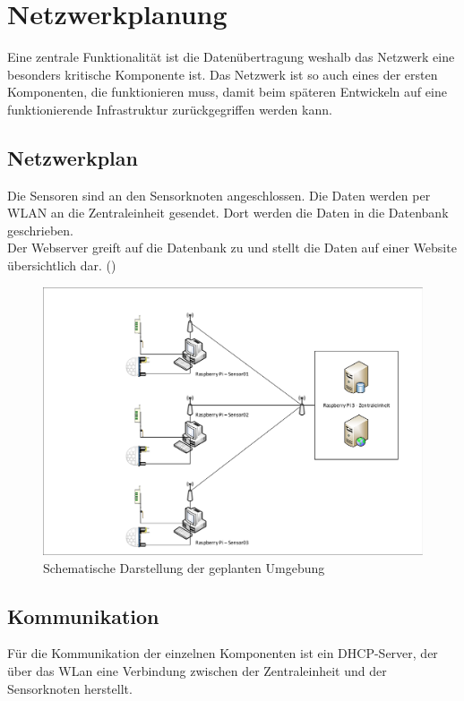 \section{Netzwerkplanung}
Eine zentrale Funktionalität ist die Datenübertragung weshalb das Netzwerk eine besonders kritische Komponente ist. Das Netzwerk ist so auch eines der ersten Komponenten, die funktionieren muss, damit beim späteren Entwickeln auf eine funktionierende Infrastruktur zurückgegriffen werden kann.
\subsection{Netzwerkplan}
Die Sensoren sind an den Sensorknoten angeschlossen. Die Daten werden per WLAN
an die Zentraleinheit gesendet. Dort werden die Daten in die Datenbank
geschrieben.\\
Der Webserver greift auf die Datenbank zu und stellt die Daten auf einer Website
übersichtlich dar. ()
\begin{figure} [htb]
\begin{centering}
\includegraphics[scale=0.4]{Bilder/Netzplan.pdf}
\caption[Schematische Darstellung der geplanten Umgebung]{Schematische
Darstellung der geplanten Umgebung}
\label{Darstellung_Umgebung}
\end{centering}
\end{figure} 

\subsection{Kommunikation}
Für die Kommunikation der einzelnen Komponenten ist ein DHCP-Server, der über das WLan eine Verbindung zwischen der Zentraleinheit und der Sensorknoten herstellt.

